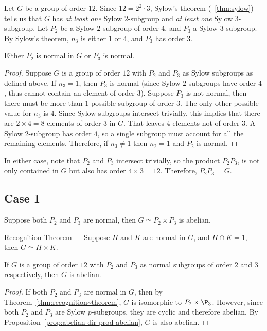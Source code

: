 Let $G$ be a group of order $12$.
Since $12 = 2^2 \cdot 3$, Sylow's theorem (~\ref{thm:sylow})
tells us that $G$ has \emph{at least one} Sylow $2$-subgroup
and \emph{at least one} Sylow $3$-subgroup.
Let $P_2$ be a Sylow $2$-subgroup of order $4$, and $P_3$ a Sylow $3$-subgroup.
By Sylow's theorem, $n_3$ is either $1$ or $4$, and $P_3$ has order $3$.

\begin{proposition}
  Either $P_2$ is normal in $G$ or $P_3$ is normal.

  \begin{proof}
    Suppose $G$ is a group of order $12$ with $P_2$ and $P_3$
    as Sylow subgroups as defined above.
    If $n_3 = 1$, then $P_3$ is normal (since Sylow $2$-subgroups
    have order $4$, thus cannot contain an element of order $3$).
    Suppose $P_3$ is not normal, then there must be more than
    $1$ possible subgroup of order $3$.
    The only other possible value for $n_3$ is $4$.
    Since Sylow subgroups intersect trivially,
    this implies that there are $2 \times 4 = 8$ elements of order $3$ in $G$.
    That leaves $4$ elements not of order $3$.
    A Sylow $2$-subgroup has order $4$, so a single subgroup
    must account for all the remaining elements. Therefore,
    if $n_3 \neq 1$ then $n_2 = 1$ and $P_2$ is normal.
  \end{proof}

  In either case, note that $P_2$ and $P_3$ intersect trivially,
  so the product $P_2P_3$, is not only contained in $G$
  but also has order $4 \times 3 = 12$.
  Therefore, $P_2P_3 = G$.
\end{proposition}

\subsection*{Case 1} Suppose both $P_2$ and $P_3$ are normal,
then $G \simeq P_2 \times P_3$ is abelian.

\begin{theorem}{Recognition Theorem}~\label{thm:recognition~theorem}
  ~\cite[DF, section 5.4, Theorem 9, p.~171--172]{DummitFoote}
  Suppose $H$ and $K$ are normal in $G$, and $H \cap K = 1$,
  then $G \simeq H \times K$.
\end{theorem}

\begin{corollary}
  If $G$ is a group of order $12$ with $P_2$ and $P_3$ as normal subgroups
  of order $2$ and $3$ respectively, then $G$ is abelian.
  
  \begin{proof}
    If both $P_2$ and $P_3$ are normal in $G$,
    then by Theorem~\ref{thm:recognition~theorem}, $G$ is isomorphic to $P_2 \times \P_3$.
    However, since both $P_2$ and $P_3$ are Sylow $p$-subgroups, they are cyclic
    and therefore abelian.
    By Proposition~\ref{prop:abelian-dir-prod-abelian}, $G$ is also abelian.
  \end{proof}
\end{corollary}

